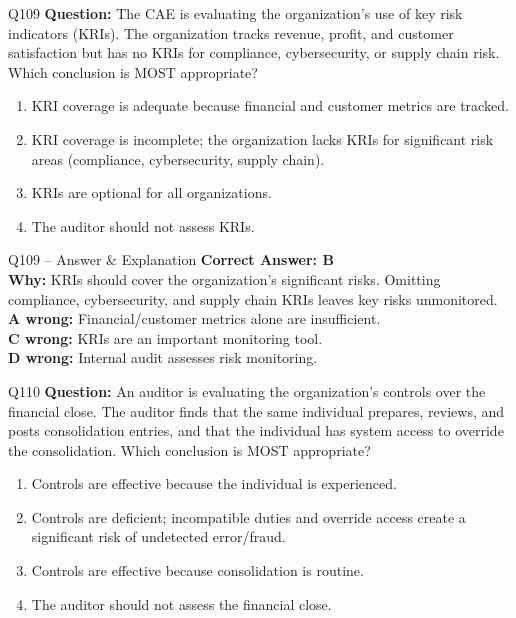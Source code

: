 \documentclass[aspectratio=169,10pt]{beamer}
\begin{document}
	\begin{frame}[t]{Q109}
		\small
		\textbf{Question:} The CAE is evaluating the organization's use of key risk indicators (KRIs). The organization tracks revenue, profit, and customer satisfaction but has no KRIs for compliance, cybersecurity, or supply chain risk. Which conclusion is MOST appropriate?
		\begin{enumerate}[label=\Alph*.,itemsep=1pt,topsep=2pt]
			\item KRI coverage is adequate because financial and customer metrics are tracked.
			\item KRI coverage is incomplete; the organization lacks KRIs for significant risk areas (compliance, cybersecurity, supply chain).
			\item KRIs are optional for all organizations.
			\item The auditor should not assess KRIs.
		\end{enumerate}
	\end{frame}
	
	\begin{frame}[t]{Q109 -- Answer \& Explanation}
		\small
		\textbf{Correct Answer: B} \\[4pt]
		\textbf{Why:} KRIs should cover the organization's significant risks. Omitting compliance, cybersecurity, and supply chain KRIs leaves key risks unmonitored. \\[4pt]
		\textbf{A wrong:} Financial/customer metrics alone are insufficient. \\[2pt]
		\textbf{C wrong:} KRIs are an important monitoring tool. \\[2pt]
		\textbf{D wrong:} Internal audit assesses risk monitoring.
	\end{frame}
	
	\begin{frame}[t]{Q110}
		\small
		\textbf{Question:} An auditor is evaluating the organization's controls over the financial close. The auditor finds that the same individual prepares, reviews, and posts consolidation entries, and that the individual has system access to override the consolidation. Which conclusion is MOST appropriate?
		\begin{enumerate}[label=\Alph*.,itemsep=1pt,topsep=2pt]
			\item Controls are effective because the individual is experienced.
			\item Controls are deficient; incompatible duties and override access create a significant risk of undetected error/fraud.
			\item Controls are effective because consolidation is routine.
			\item The auditor should not assess the financial close.
		\end{enumerate}
	\end{frame}
	
\end{document}
